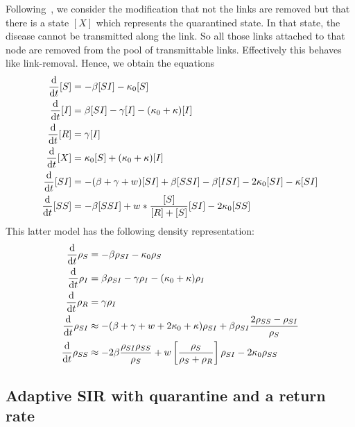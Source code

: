 \documentclass[12pt]{article}
\def\txtd{{\textnormal{d}}}
\begin{document}
 Following~\cite{MaierBrockmann}, we consider the modification that not the links are removed but that there is a state $[X]$ which represents the quarantined state. In that state, the disease cannot be transmitted along the link. So all those links attached to that node are removed from the pool of transmittable links. Effectively this behaves like link-removal. Hence, we obtain the equations
\begin{align*}
 \frac{\txtd }{\txtd t} [S]
 &=
 -\beta [SI] - \kappa_0[S]
 \\
 \frac{\txtd }{\txtd t} [I]
 &=
 \beta [SI] - \gamma [I] - (\kappa_0+\kappa)[I]
 \\
 \frac{\txtd }{\txtd t} [R]
 &=
\gamma [I]
 \\
  \frac{\txtd }{\txtd t} [X]
 &=
\kappa_0 [S] + (\kappa_0+\kappa)[I]
 \\
 \frac{\txtd }{\txtd t} [SI]
 &=
 -(\beta+\gamma+w)[SI] + \beta[SSI] -\beta[ISI] -2\kappa_0 [SI] - \kappa [SI] 
 \\
 \frac{\txtd }{\txtd t} [SS]
 &=
- \beta [SSI] + w*\frac{[S]}{[R]+[S]} [SI] -2\kappa_0 [SS]
 \end{align*}
 This latter model has the following density representation:
  \begin{align*}
  \frac{\txtd }{\txtd t} \rho_S
  &= 
  -\beta \rho_{SI} - \kappa_0\rho_S\\
 \frac{\txtd }{\txtd t}\rho_I 
  &=
   \beta \rho_{SI} - \gamma \rho_I  - (\kappa_0+\kappa) \rho_I
   \\
     \frac{\txtd }{\txtd t} \rho_R 
  &=
    \gamma \rho_I
\\
     \frac{\txtd }{\txtd t} \rho_{SI}
&\approx
-(\beta+\gamma+w +2\kappa_0 +\kappa) \rho_{SI} +\beta \rho_{SI}\frac{ 2 \rho_{SS}-\rho_{SI}  }{\rho_S}
\\
    \frac{\txtd }{\txtd t} \rho_{SS}
&\approx
-2\beta \frac{\rho_{SI} \rho_{SS}}{\rho_S}
+w\left[\frac{\rho_S}{\rho_S+\rho_R}\right]\rho_{SI} - 2\kappa_0\rho_{SS}
 \end{align*}

\subsection{Adaptive SIR with quarantine and a return rate}
\end{document}
